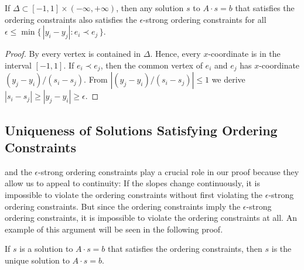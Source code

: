\begin{lem}
  If
  $\Delta\subset[-1,1]\times(-\infty,+\infty)$, then
	any solution $s$ to $A\cdot s=b$ that satisfies
	the ordering constraints
	also satisfies 
	the $\epsilon$-strong ordering constraints
	for all $\epsilon\le\min\{\,|y_i-y_j| : e_i\prec e_j\,\}$.
\end{lem}

\begin{proof}
	By  every vertex is contained in
	 $\Delta$. %
	Hence, every $x$-coordinate is in the interval $[-1,1]$.
	If $e_i\prec e_j$, then the common vertex of $e_i$ and $e_j$ has $x$-coordinate
	$(y_j-y_i)/(s_i-s_j)$.	From $|(y_j-y_i)/(s_i-s_j)|\le 1$ we
	derive $|s_i-s_j|\ge|y_j-y_i| \ge \epsilon$.
\end{proof}

\subsection{Uniqueness of Solutions Satisfying Ordering Constraints}

 and the $\epsilon$-strong ordering
constraints play a crucial role in our proof because they
allow us to appeal to continuity: If the slopes change continuously,
it is impossible 
to violate
the ordering constraints without first violating the
$\epsilon$-strong ordering constraints.
But since the ordering constraints imply the
$\epsilon$-strong ordering constraints,
it is impossible
to violate
the ordering constraints at all.
An example of this argument will be seen in the following proof.

\begin{lem}
	If $s$ is a solution to $A\cdot s=b$ that satisfies the ordering
	constraints, %
	then $s$ is 
	the unique solution to $A\cdot s=b$.
\end{lem}

